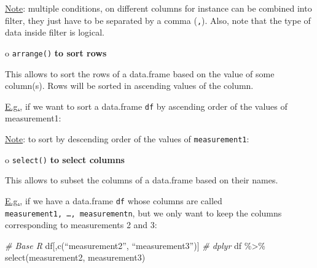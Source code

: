 \documentclass[
]{article}
\newenvironment{Shaded}{\begin{snugshade}}{\end{snugshade}}
\newcommand{\AttributeTok}[1]{\textcolor[rgb]{0.77,0.63,0.00}{#1}}
\newcommand{\CommentTok}[1]{\textcolor[rgb]{0.56,0.35,0.01}{\textit{#1}}}
\newcommand{\ConstantTok}[1]{\textcolor[rgb]{0.00,0.00,0.00}{#1}}
\newcommand{\FunctionTok}[1]{\textcolor[rgb]{0.00,0.00,0.00}{#1}}
\newcommand{\NormalTok}[1]{#1}
\newcommand{\SpecialCharTok}[1]{\textcolor[rgb]{0.00,0.00,0.00}{#1}}
\begin{document}
\underline{Note}: multiple conditions, on different columns for instance
can be combined into filter, they just have to be separated by a comma
(\texttt{,}). Also, note that the type of data inside filter is logical.

o \texttt{arrange()} \textbf{to sort rows}

This allows to sort the rows of a data.frame based on the value of some
column(s). Rows will be sorted in ascending values of the column.

\underline{E.g.}, if we want to sort a data.frame \texttt{df} by
ascending order of the values of measurement1:

\begin{Shaded}
\end{Shaded}

\underline{Note}: to sort by descending order of the values of
\texttt{measurement1}:

\begin{Shaded}
\end{Shaded}

o \texttt{select()} \textbf{to select columns}

This allows to subset the columns of a data.frame based on their names.

\underline{E.g.}, if we have a data.frame \texttt{df} whose columns are
called \texttt{measurement1,\ …,\ measurementn}, but we only want to
keep the columns corresponding to measurements 2 and 3:

\begin{Shaded}
\begin{Highlighting}[]
\CommentTok{\# Base R}
\NormalTok{df[,}\FunctionTok{c}\NormalTok{(“measurement2”, “measurement3”)]}
\CommentTok{\# dplyr}
\NormalTok{df }\SpecialCharTok{\%\textgreater{}\%} \FunctionTok{select}\NormalTok{(measurement2, measurement3)}
\end{Highlighting}
\end{Shaded}
\end{document}
